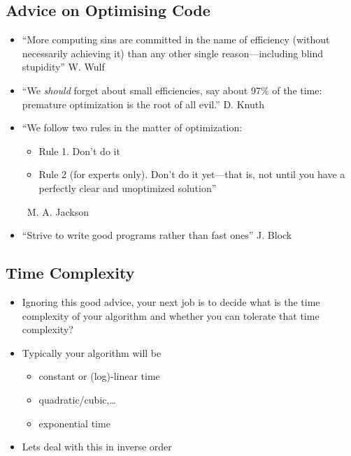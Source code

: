 
\begin{slide}
\section[-2]{Advice on Optimising Code}

\begin{PauseHighLight}
  \begin{itemize} \squeeze
  \item ``More computing sins are committed in the name of efficiency
    (without necessarily achieving it) than any other single
    reason---including blind stupidity'' \hfill W. Wulf\pause
  \item ``We \textit{should} forget about small efficiencies, say about
    97\% of the time: premature optimization is the root of all evil.''
    \hfill D. Knuth\pause
  \item ``We follow two rules in the matter of optimization:
    \begin{itemize}
    \item Rule 1. Don't do it
    \item Rule 2 (for experts only).  Don't do it yet---that is, not
      until you have a perfectly clear and unoptimized solution''
    \end{itemize}
    \ \hfill M. A. Jackson\pause
  \item ``Strive to write good programs rather than fast ones'' \hfill
    J. Block\pause
  \end{itemize}
\end{PauseHighLight}

\end{slide}


\begin{slide}
\section{Time Complexity}

\begin{PauseHighLight}
  \begin{itemize}
  \item Ignoring this good advice, your next job is to
    decide what is the time complexity of your algorithm and whether you
    can tolerate that time complexity?\pause
  \item Typically your algorithm will be
    \begin{itemize}
    \item constant or (log)-linear time {\Large \Smiley}
    \item quadratic/cubic,\ldots
    \item exponential time {\Large \Frowny}\pause
    \end{itemize}
  \item Lets deal with this in inverse order\pause
  \end{itemize}
\end{PauseHighLight}

\end{slide}

